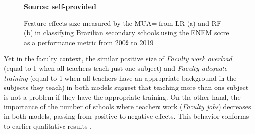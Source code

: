 \begin{figure}[ht!]
\centering
\caption{\textmd{Feature effects size measured by the MUA= from LR (a) and RF (b) in classifying Brazilian secondary
schools using the ENEM score as a performance metric from 2009 to 2019}}
\label{fig:MUA_both_models}
\par\medskip\ABNTEXfontereduzida\selectfont\textbf{Source: self-provided}  
\par\medskip
\end{figure}


Yet in the faculty context, the similar positive size of \textit{Faculty work overload} (equal to 1 when all teachers teach just one subject) and \textit{Faculty adequate training} (equal to 1 when all teachers have an appropriate background in the subjects they teach) in both models suggest that teaching more than one subject is not a problem if they have the appropriate training. On the other hand, the importance of the number of schools where teachers work (\textit{Faculty jobs}) decreases in both models, passing from positive to negative effects. This behavior conforms to earlier qualitative results \cite{Barbosa_2013, Souza2020ODECENAL}.

